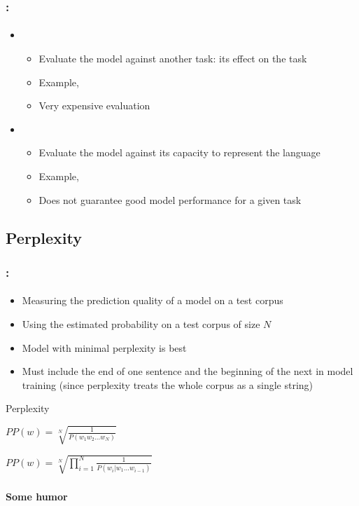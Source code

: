 \documentclass[xcolor=table]{beamer}
\begin{document}
\begin{frame}
	\frametitle{\insertshortsubtitle: \insertsection}
	\framesubtitle{\insertsubsection}

	\begin{itemize}
		\item {}
		\begin{itemize}
			\item Evaluate the model against another task: its effect on the task
			\item Example, 
			\item Very expensive evaluation
		\end{itemize}
		\item {}
		\begin{itemize}
			\item Evaluate the model against its capacity to represent the language
			\item Example, 
			\item Does not guarantee good model performance for a given task
		\end{itemize}
	\end{itemize}

\end{frame}

\subsection{Perplexity}

\begin{frame}
	\frametitle{\insertshortsubtitle: \insertsection}
	\framesubtitle{\insertsubsection}

	\begin{itemize}
		\item Measuring the prediction quality of a model on a test corpus
		\item Using the estimated probability on a test corpus of size $N$
		\item Model with minimal perplexity is best
		\item Must include the end of one sentence and the beginning of the next in model training (since perplexity treats the whole corpus as a single string)
	\end{itemize}
	
	\begin{block}{Perplexity}
		\begin{center}
			$PP(w) = \sqrt[N]{\frac{1}{P(w_1 w_2 \ldots w_N)}}$
			
			$PP(w) = \sqrt[N]{\prod\limits_{i=1}^{N}\frac{1}{P(w_i | w_1 \ldots w_{i-1})}}$
		\end{center}
	\end{block}

\end{frame}


\begin{frame}
	\frametitle{\insertshortsubtitle}
	\framesubtitle{Some humor}

	\begin{center}
	\end{center}

\end{frame}

\end{document}
